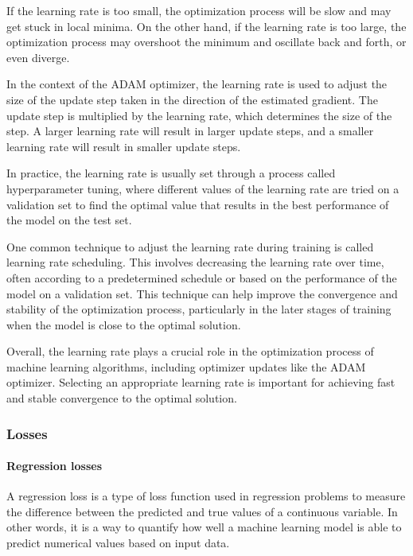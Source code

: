 If the learning rate is too small, the optimization process will be slow and may get stuck in local minima. On the other hand, if the learning rate is too large, the optimization process may overshoot the minimum and oscillate back and forth, or even diverge.

In the context of the ADAM optimizer, the learning rate is used to adjust the size of the update step taken in the direction of the estimated gradient. The update step is multiplied by the learning rate, which determines the size of the step. A larger learning rate will result in larger update steps, and a smaller learning rate will result in smaller update steps.

In practice, the learning rate is usually set through a process called hyperparameter tuning, where different values of the learning rate are tried on a validation set to find the optimal value that results in the best performance of the model on the test set.

One common technique to adjust the learning rate during training is called learning rate scheduling. This involves decreasing the learning rate over time, often according to a predetermined schedule or based on the performance of the model on a validation set. This technique can help improve the convergence and stability of the optimization process, particularly in the later stages of training when the model is close to the optimal solution.

Overall, the learning rate plays a crucial role in the optimization process of machine learning algorithms, including optimizer updates like the ADAM optimizer. Selecting an appropriate learning rate is important for achieving fast and stable convergence to the optimal solution.

\subsubsection{Losses}
\label{subsubsec:3_losses}

\paragraph{Regression losses}
\label{par:3_regressions_losses}


A regression loss is a type of loss function used in regression problems to measure the difference between the predicted and true values of a continuous variable. In other words, it is a way to quantify how well a machine learning model is able to predict numerical values based on input data.

